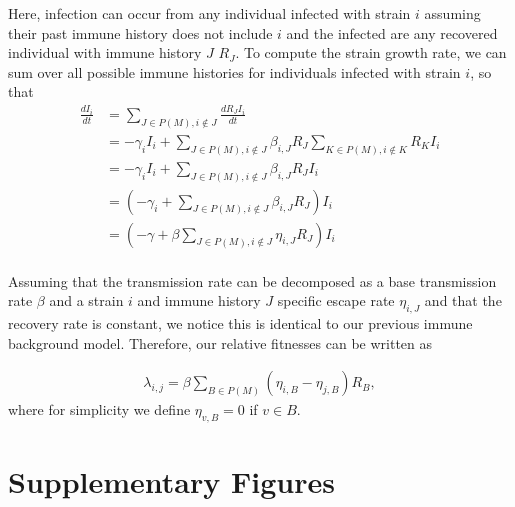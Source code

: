 \documentclass[12pt,oneside,letterpaper]{article}
\newcommand{\varEscape}{\eta}
\begin{document}
Here, infection can occur from any individual infected with strain $i$ assuming their past immune history does not include $i$ and the infected are any recovered individual with immune history $J$  $R_{J}$.
To compute the strain growth rate, we can sum over all possible immune histories for individuals infected with strain $i$, so that
\begin{align*}
    \frac{d I_{i}}{d t} &= \sum_{J \in P(M), i \notin J} \frac{dR_{J} I_{i}}{dt} \\
                        &= - \gamma_{i} I_{i} + \sum_{J \in P(M), i \notin J} \beta_{i, J} R_{J} \sum_{K \in P(M), i\notin K} R_{K}I_{i}\\
                        &= - \gamma_{i} I_{i} + \sum_{J \in P(M), i \notin J} \beta_{i, J} R_{J} I_{i}\\
                        &= \left(-\gamma_{i} + \sum_{J \in P(M), i \notin J} \beta_{i,J} R_{J} \right) I_{i}\\
                        &= \left(-\gamma + \beta\sum_{J \in P(M), i \notin J} \varEscape_{i,J} R_{J} \right) I_{i}\\
\end{align*}

Assuming that the transmission rate can be decomposed as a base transmission rate $\beta$ and a strain $i$ and immune history $J$ specific escape rate $\varEscape_{i, J}$ and that the recovery rate is constant, we notice this is identical to our previous immune background model.
Therefore, our relative fitnesses can be written as

\begin{align*}
    \lambda_{i, j} = \beta \sum_{B \in P(M)} (\varEscape_{i, B} - \varEscape_{j, B}) R_{B},
\end{align*}
where for simplicity we define $\varEscape_{v, B} = 0$ if $v \in B$.

\section*{Supplementary Figures}
\end{document}
